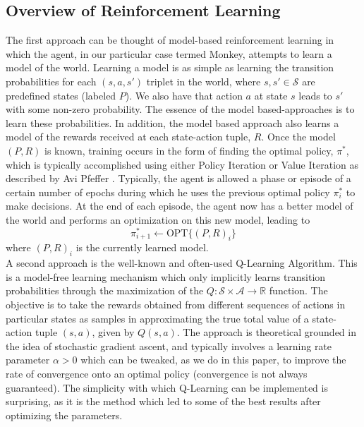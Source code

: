 \documentclass[letterpaper]{article}
\begin{document}
\subsection{Overview of Reinforcement Learning}
The first approach can be thought of model-based reinforcement learning in which the agent, in our particular case termed Monkey, attempts to learn a model of the world. Learning a model is as simple as learning the transition probabilities for each $(s,a,s')$ triplet in the world, where $s,s' \in \mathcal{S}$ are predefined states (labeled $P$). We also have that action $a$ at state $s$ leads to $s'$ with some non-zero probability. The essence of the model based-approaches is to learn these probabilities. In addition, the model based approach also learns a model of the rewards received at each state-action tuple, $R$. Once the model $(P,R)$ is known, training occurs in the form of finding the optimal policy, $\pi^*$, which is typically accomplished using either Policy Iteration or Value Iteration as described by Avi Pfeffer \cite{mdp_lecture}. Typically, the agent is allowed a phase or episode of a certain number of epochs during which he uses the previous optimal policy $\pi_i^*$ to make decisions. At the end of each episode, the agent now has a better model of the world and performs an optimization on this new model, leading to 
\[
\pi_{i+1}^* \leftarrow \text{OPT}\{(P,R)_i\}
\]
where $(P,R)_i$ is the currently learned model.\\

A second approach is the well-known and often-used Q-Learning Algorithm. This is a model-free learning mechanism which only implicitly learns transition probabilities through the maximization of the $Q: \mathcal{S} \times \mathcal{A} \to \mathbb{R}$ function. The objective is to take the rewards obtained from different sequences of actions in particular states as samples in approximating the true total value of a state-action tuple $(s,a)$, given by $Q(s,a)$. The approach is theoretical grounded in the idea of stochastic gradient ascent, and typically involves a learning rate parameter $\alpha > 0$ which can be tweaked, as we do in this paper, to improve the rate of convergence onto an optimal policy (convergence is not always guaranteed). The simplicity with which Q-Learning can be implemented is surprising, as it is the method which led to some of the best results after optimizing the parameters.\\
\end{document}
